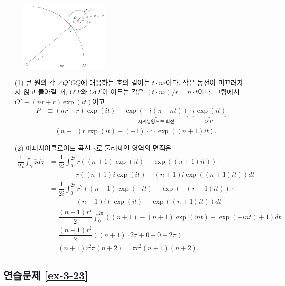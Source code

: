 \begin{figure}[h!]
\begin{center}
\includegraphics[width=0.4\textwidth]{./Solution/figs/fig-s-0-10}
\end{center}
\end{figure}

\begin{itemize}
\item[(1)] 큰 원의 각 $\angle Q'OQ$에 대응하는 호의 길이는 $t\cdot nr$이다.
작은 동전이 미끄러지지 않고 돌아갈 때, $O'P$와 $OO'$이 이루는 각은
$(t\cdot nr)/r = n\cdot t$이다. 그림에서 $O' \equiv (nr+r)\exp(it)$이고
\begin{align*}
P & \equiv (nr+r)\exp(it) + 
\underbrace{\exp(-i(\pi-nt))}_{\text{시계방향으로 회전}}\cdot
\underbrace{r\exp(it)}_{O'P'} \\
&=(n+1)r\exp(it) + (-1)\cdot r\cdot \exp((n+1)it).
\end{align*}
\item[(2)] 에피사이클로이드 곡선 $\gamma$로 둘러싸인 영역의 면적은
 \begin{align*}
\dfrac1{2i} \int_\gamma \bar z dz 
&= \dfrac1{2i}\int_0^{2\pi} \overline{r\left( (n+1)\exp(it)-\exp((n+1)it)\right)}\cdot \\
&\qquad\qquad r\left((n+1)i\exp(it) - (n+1)i\exp((n+1)it)\right)dt \\
&= \dfrac1{2i} \int_0^{2\pi} r^2\left( (n+1)\exp(-it) - \exp(-(n+1)it)\right)\cdot  \\
&\qquad\qquad (n+1)i\left(\exp(it) - \exp((n+1)it)\right)dt \\
&= \dfrac{(n+1)r^2}2 \int_0^{2\pi} ((n+1) -(n+1)\exp(int) - \exp(-int) +1)dt \\
&= \dfrac{(n+1)r^2}2 ((n+1) \cdot 2\pi + 0+0 + 2\pi) \\
&= (n+1)r^2\pi(n+2) = \pi r^2 (n+1)(n+2).
\end{align*}
\end{itemize}

\subsection*{연습문제 \ref{ex-3-23}}

